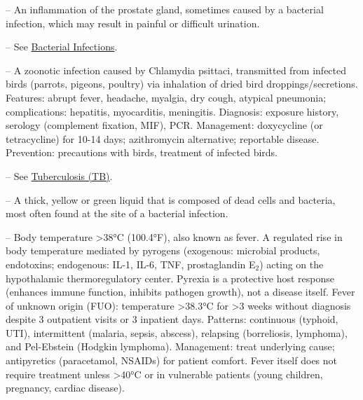 -- An inflammation of the prostate gland, sometimes caused by a bacterial infection, which may result in painful or difficult urination.

-- See \hyperlink{Bacterial Infections}{Bacterial Infections}.

-- A zoonotic infection caused by Chlamydia psittaci, transmitted from infected birds (parrots, pigeons, poultry) via inhalation of dried bird droppings/secretions. Features: abrupt fever, headache, myalgia, dry cough, atypical pneumonia; complications: hepatitis, myocarditis, meningitis. Diagnosis: exposure history, serology (complement fixation, MIF), PCR. Management: doxycycline (or tetracycline) for 10-14 days; azithromycin alternative; reportable disease. Prevention: precautions with birds, treatment of infected birds.

-- See \hyperlink{Tuberculosis (TB)}{Tuberculosis (TB)}.

-- A thick, yellow or green liquid that is composed of dead cells and bacteria, most often found at the site of a bacterial infection.

-- Body temperature >38°C (100.4°F), also known as fever. A regulated rise in body temperature mediated by pyrogens (exogenous: microbial products, endotoxins; endogenous: IL-1, IL-6, TNF, prostaglandin E$_2$) acting on the hypothalamic thermoregulatory center. Pyrexia is a protective host response (enhances immune function, inhibits pathogen growth), not a disease itself. Fever of unknown origin (FUO): temperature >38.3°C for >3 weeks without diagnosis despite 3 outpatient visits or 3 inpatient days. Patterns: continuous (typhoid, UTI), intermittent (malaria, sepsis, abscess), relapsing (borreliosis, lymphoma), and Pel-Ebstein (Hodgkin lymphoma). Management: treat underlying cause; antipyretics (paracetamol, NSAIDs) for patient comfort. Fever itself does not require treatment unless >40°C or in vulnerable patients (young children, pregnancy, cardiac disease).

